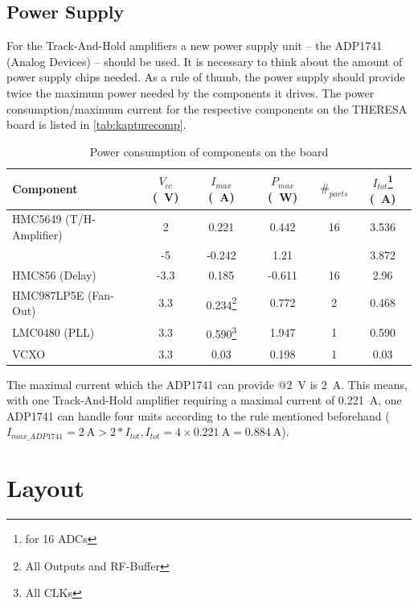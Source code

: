 \subsection{Power Supply}
For the Track-And-Hold amplifiers a new power supply unit -- the ADP1741 (Analog Devices) -- should be used. It is necessary to think about the amount of power supply chips needed. As a rule of thumb, the power supply should provide twice the maximum power needed by the components it drives. The power consumption/maximum current for the respective components on the THERESA board is listed in \autoref{tab:kapturecomp}. 
\begin{table}[tbh]
	\caption{Power consumption of components on the board}
	\label{tab:kapturecomp}
	\begin{minipage}{\textwidth}
		\centering
		\begin{tabularx}{\textwidth}{XSSSSS}
			\toprule
			\textbf{Component} & \textbf{$V_{cc}$ (\SI{}{\volt})} & \textbf{$I_{max}$ (\SI{}{\ampere})} & \textbf{$P_{max}$ (\SI{}{\watt})} & $\#_{parts}$ & \textbf{$I_{tot}$}\footnote{for 16 ADCs} (\SI{}{\ampere})\\
			\midrule
			HMC5649 (T/H-Amplifier) 	& 2	  	& 0.221 	 & 0.442 & 16 & 3.536\\
			& -5  	& -0.242 & 1.21 &  & 3.872\\
			HMC856 (Delay) 			& -3.3	& 0.185 & -0.611 & 16 & 2.96\\
			HMC987LP5E (Fan-Out) 	& 3.3 	& 0.234\footnote{All Outputs and RF-Buffer} & 0.772 & 2 & 0.468\\
			LMC0480 (PLL) 			& 3.3 	& 0.590\footnote{All CLKs} & 1.947 & 1 & 0.590\\
			VCXO 					& 3.3 	& 0.03 & 0.198 & 1 & 0.03\\
			\bottomrule
		\end{tabularx}
	\end{minipage}
\end{table}

The maximal current which the ADP1741 can provide @\SI{2}{\volt} is \SI{2}{\ampere}. This means, with one Track-And-Hold amplifier requiring a maximal current of \SI{0.221}{\ampere}, one ADP1741 can handle four units according to the rule mentioned beforehand ($I_{max\_ADP1741} = \SI{2}{\ampere} > 2 * I_{tot}, I_{tot} = 4 \times \SI{0.221}{\ampere} =  \SI{0.884}{\ampere}$).



\section{Layout}

